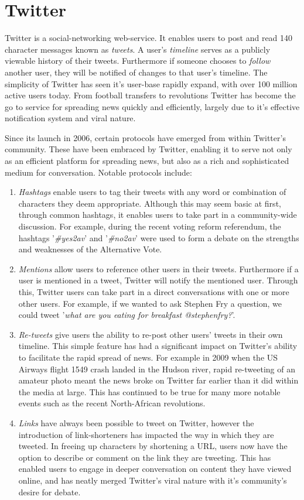 \section{Twitter}
\label{background:twitter}

Twitter is a social-networking web-service. It enables users to post and read 140 character messages known as \emph{tweets}. A user's \emph{timeline} serves as a publicly viewable history of their tweets. Furthermore if someone chooses to \emph{follow} another user, they will be notified of changes to that user's timeline. The simplicity of Twitter has seen it's user-base rapidly expand, with over 100 million active users today. From football transfers to revolutions Twitter has become the go to service for spreading news quickly and efficiently, largely due to it's effective notification system and viral nature.

Since its launch in 2006, certain protocols have emerged from within Twitter's community. These have been embraced by Twitter, enabling it to serve not only as an efficient platform for spreading news, but also as a rich and sophisticated medium for conversation. Notable protocols include:

\begin{enumerate}
	\item \emph{Hashtags} enable users to tag their tweets with any word or combination of characters they deem appropriate. Although this may seem basic at first, through common hashtags, it enables users to take part in a community-wide discussion. For example, during the recent voting reform referendum, the hashtags '\emph{\#yes2av}' and '\emph{\#no2av}' were used to form a debate on the strengths and weaknesses of the Alternative Vote. 
	\item \emph{Mentions} allow users to reference other users in their tweets. Furthermore if a user is mentioned in a tweet, Twitter will notify the mentioned user. Through this, Twitter users can take part in a direct conversations with one or more other users. For example, if we wanted to ask Stephen Fry a question, we could tweet '\emph{what are you eating for breakfast @stephenfry?}'.
	\item \emph{Re-tweets} give users the ability to re-post other users' tweets in their own timeline. This simple feature has had a significant impact on Twitter's ability to facilitate the rapid spread of news. For example in 2009 when the US Airways flight 1549 crash landed in the Hudson river, rapid re-tweeting of an amateur photo meant the news broke on Twitter far earlier than it did within the media at large. This has continued to be true for many more notable events such as the recent North-African revolutions.
	\item \emph{Links} have always been possible to tweet on Twitter, however the introduction of link-shorteners has impacted the way in which they are tweeted. In freeing up characters by shortening a URL, users now have the option to describe or comment on the link they are tweeting. This has enabled users to engage in deeper conversation on content they have viewed online, and has neatly merged Twitter's viral nature with it's community's desire for debate.
\end{enumerate}


